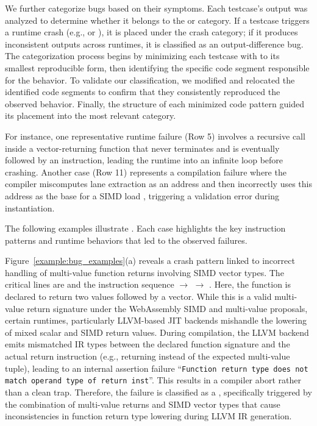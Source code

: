\documentclass[lettersize,journal]{IEEEtran}
\begin{document}
We further categorize bugs based on their symptoms. Each testcase’s output was analyzed to determine whether it belongs to the  or  category. If a testcase triggers a runtime crash (e.g.,  or ), it is placed under the crash category; if it produces inconsistent outputs across runtimes, it is classified as an output-difference bug. The categorization process begins by minimizing each testcase with  to its smallest reproducible form, then identifying the specific code segment responsible for the behavior. To validate our classification, we modified and relocated the identified code segments to confirm that they consistently reproduced the observed behavior. Finally, the structure of each minimized code pattern guided its placement into the most relevant category.

For instance, one representative runtime failure (Row 5) involves a recursive call inside a vector-returning function that never terminates and is eventually followed by an  instruction, leading the runtime into an infinite loop before crashing. Another case (Row 11) represents a compilation failure where the compiler miscomputes lane extraction as an  address and then incorrectly uses this address as the base for a SIMD load , triggering a validation error during instantiation.

The following examples illustrate  . Each case highlights the key instruction patterns and runtime behaviors that led to the observed failures.

Figure~\ref{example:bug_examples}(a) reveals a crash pattern linked to incorrect handling of multi-value function returns involving SIMD vector types. 
The critical lines are  and the instruction sequence  $\rightarrow$  $\rightarrow$ . 
Here, the function is declared to return two  values followed by a  vector. 
While this is a valid multi-value return signature under the WebAssembly SIMD and multi-value proposals, certain runtimes, particularly LLVM-based JIT backends mishandle the lowering of mixed scalar and SIMD return values. 
During compilation, the LLVM backend emits mismatched IR types between the declared function signature and the actual return instruction (e.g., returning  instead of the expected multi-value tuple), leading to an internal assertion failure ``\texttt{Function return type does not match operand type of return inst}''. 
This results in a compiler abort rather than a clean trap. 
Therefore, the failure is classified as a , specifically triggered by the combination of multi-value returns and SIMD vector types that cause inconsistencies in function return type lowering during LLVM IR generation.
\end{document}
